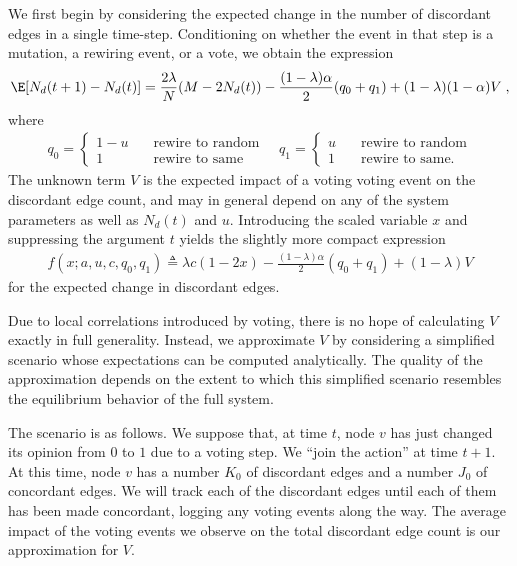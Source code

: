 \documentclass[english]{scrartcl}
\begin{document}
	We first begin by considering the expected change in the number of discordant edges in a single time-step. Conditioning on whether the event in that step is a mutation, a rewiring event, or a vote, we obtain the expression
	\begin{align*}
		\E[N_d(t+1) - N_d(t)] = \frac{2\lambda}{N}(M - 2N_d(t)) - \frac{(1-\lambda)\alpha}{2}(q_0 + q_1) + (1-\lambda)(1-\alpha)V\;,
	\end{align*}
	where 
	\begin{align*}
		q_0 = 
		\begin{cases}
			1-u &\quad \text{rewire to random} \\ 
			1 &\quad \text{rewire to same}
		\end{cases} 
		\quad 
		q_1 = 
		\begin{cases}
			u &\quad \text{rewire to random} \\ 
			1 &\quad \text{rewire to same.}
		\end{cases}
	\end{align*}
	The unknown term $V$ is the expected impact of a voting voting event on the discordant edge count, and may in general depend on any of the system parameters as well as $N_d(t)$ and $u$. Introducing the scaled variable $x$ and suppressing the argument $t$ yields the slightly more compact expression 
	\begin{align}
		f(x; a, u, c, q_0, q_1) \triangleq \lambda c(1-2x) - \frac{(1-\lambda)\alpha}{2} (q_0 + q_1) + (1-\lambda)V \label{eq:expected_change}
	\end{align} 
	for the expected change in discordant edges. 

	Due to local correlations introduced by voting, there is no hope of calculating $V$ exactly in full generality. Instead, we approximate $V$ by considering a simplified scenario whose expectations can be computed analytically. The quality of the approximation depends on the extent to which this simplified scenario resembles the equilibrium behavior of the full system. 

	The scenario is as follows. We suppose that, at time $t$, node $v$ has just changed its opinion from $0$ to $1$ due to a voting step. We ``join the action'' at time $t+1$. At this time, node $v$ has a number $K_0$ of discordant edges and a number $J_0$ of concordant edges. We will track each of the discordant edges until each of them has been made concordant, logging any voting events along the way. The average impact of the voting events we observe on the total discordant edge count is our approximation for $V$. 
\end{document}
